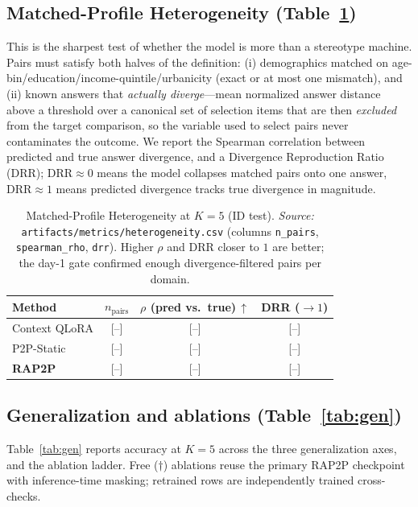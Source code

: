 \documentclass[letterpaper]{article} %
\begin{document}
\subsection{Matched-Profile Heterogeneity (Table~\ref{tab:hetero})}
\label{sec:hetero}
This is the sharpest test of whether the model is more than a stereotype
machine. Pairs must satisfy both halves of the definition: (i) demographics
matched on age-bin/education/income-quintile/urbanicity (exact or at most one
mismatch), and (ii) known answers that \emph{actually diverge}---mean
normalized answer distance above a threshold over a canonical set of selection
items that are then \emph{excluded} from the target comparison, so the variable
used to select pairs never contaminates the outcome. We report the Spearman
correlation between predicted and true answer divergence, and a Divergence
Reproduction Ratio (DRR); DRR$\approx 0$ means the model collapses matched
pairs onto one answer, DRR$\approx 1$ means predicted divergence tracks true
divergence in magnitude.

\begin{table}[t]
\centering
\caption{Matched-Profile Heterogeneity at $K{=}5$ (ID test). \emph{Source:}
\texttt{artifacts/metrics/heterogeneity.csv} (columns \texttt{n\_pairs},
\texttt{spearman\_rho}, \texttt{drr}). Higher $\rho$ and DRR closer to $1$ are
better; the day-1 gate confirmed enough divergence-filtered pairs per domain.}
\label{tab:hetero}
\setlength{\tabcolsep}{5pt}
\begin{tabular}{lccc}
\toprule
Method & $n_{\mathrm{pairs}}$ & $\rho$ (pred vs.\ true)\,$\uparrow$ & DRR ($\to 1$) \\
\midrule
Context QLoRA  & [--] & [--] & [--] \\
P2P-Static     & [--] & [--] & [--] \\
\textbf{RAP2P} & [--] & [--] & [--] \\
\bottomrule
\end{tabular}
\end{table}

\subsection{Generalization and ablations (Table~\ref{tab:gen})}
\label{sec:ablations}
Table~\ref{tab:gen} reports accuracy at $K{=}5$ across the three
generalization axes, and the ablation ladder. Free ($\dagger$) ablations reuse
the primary RAP2P checkpoint with inference-time masking; retrained rows are
independently trained cross-checks.
\end{document}
